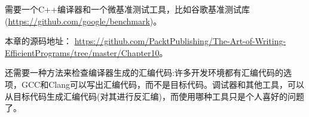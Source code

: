 
需要一个C++编译器和一个微基准测试工具，比如谷歌基准测试库(\url{https://github.com/google/benchmark})。

本章的源码地址： \url{https://github.com/PacktPublishing/The-Art-of-Writing-EfficientPrograms/tree/master/Chapter10}。

还需要一种方法来检查编译器生成的汇编代码:许多开发环境都有汇编代码的选项，GCC和Clang可以写出汇编代码，而不是目标代码。调试器和其他工具，可以从目标代码生成汇编代码(对其进行反汇编)，而使用哪种工具只是个人喜好的问题了。